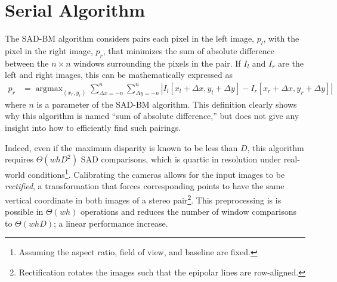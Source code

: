 \documentclass{article}
\newcommand{\abs}[1]{\left|#1\right|}
\DeclareMathOperator*{\argmin}{argmax}
\begin{document}
\section{Serial Algorithm}
\label{sec:serial}
The SAD-BM algorithm considers pairs each pixel in the left image, $p_l$, with
the pixel in the right image, $p_r$, that minimizes the sum of absolute
difference between the $n \times n$ windows surrounding the pixels in the pair.
If $I_l$ and $I_r$ are the left and right images, this can be mathematically
expressed as
\begin{align*}
    p_r &= \argmin_{(x_r, y_r)}
             \sum_{\Delta x = -n}^n \sum_{\Delta y = -n}^n \abs{
                 I_l[x_l + \Delta x, y_l + \Delta y]
               - I_r[x_r + \Delta x, y_r + \Delta y]
           }
\end{align*}
where $n$ is a parameter of the SAD-BM algorithm. This definition clearly shows
why this algorithm is named ``sum of absolute difference,'' but does not give
any insight into how to efficiently find such pairings.

Indeed, even if the maximum disparity is known to be less than $D$, this
algorithm requires $\Theta(whD^2)$ SAD comparisons, which is quartic in
resolution under real-world conditions\footnote{Assuming the aspect ratio,
field of view, and baseline are fixed.}. Calibrating the cameras allows for the
input images to be \textit{rectified}, a transformation that forces
corresponding points to have the same vertical coordinate in both images of a
stereo pair\footnote{Rectification rotates the images such that the epipolar
lines are row-aligned.}. This preprocessing is is possible in $\Theta(wh)$
operations and reduces the number of window comparisons to $\Theta(whD)$; a
linear performance increase.
\end{document}
